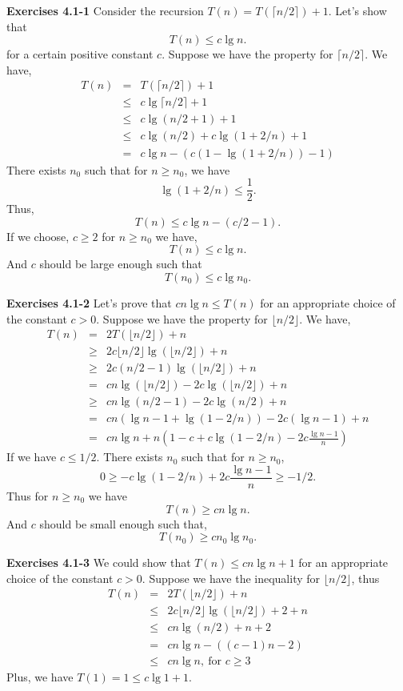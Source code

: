 \documentclass[a4paper,12pt]{article}
\newcommand{\newpar}[1]
{\bigskip \noindent \textbf{Exercises #1} \newline}
\begin{document}
\newpar{4.1-1}
Consider the recursion $T(n) = T(\lceil n/2\rceil) + 1$.  Let's show
that
\[ T(n) \le c \lg n.\]
for a certain positive constant $c$.  Suppose we have the property for 
$\lceil n/2 \rceil$.  We have,
\begin{eqnarray*}
T(n) &=& T(\lceil n/2\rceil) + 1 \\
&\le& c\lg \lceil n/2\rceil + 1 \\
&\le& c\lg(n/2 + 1) + 1 \\
&\le& c\lg(n/2) + c\lg(1 + 2/n) + 1 \\
&=& c\lg n - (c(1 - \lg(1 + 2/n)) - 1)
\end{eqnarray*}
There exists $n_0$ such that for $n \ge n_0$, we have
\[ \lg(1 + 2/n) \le \frac{1}{2}.\]
Thus,
\[ T(n) \le c\lg n - (c/2 - 1).\]
If we choose, $c \ge 2$ for $n \ge n_0$ we have,
\[ T(n) \le c\lg n.\]
And $c$ should be large enough such that
\[ T(n_0) \le c\lg n_0.\]

\newpar{4.1-2}
Let's prove that $c n\lg n \le T(n)$ for an appropriate choice of the
constant $c > 0$.  Suppose we have the property for $\lfloor n/2
\rfloor$. We have,
\begin{eqnarray*}
T(n) &=& 2 T(\lfloor n/2 \rfloor) + n \\
&\ge& 2c\lfloor n/2\rfloor
\lg(\lfloor n/2\rfloor) + n \\
&\ge&2c(n/2-1) \lg(\lfloor n/2\rfloor) + n \\
&=& c n\lg(\lfloor n/2\rfloor) - 2c\lg(\lfloor n/2\rfloor) + n \\
&\ge& cn\lg(n/2 - 1) - 2c\lg(n/2) + n \\
&=& cn(\lg n - 1 + \lg(1 - 2/n)) - 2c(\lg n-1) + n \\
&=& cn\lg n + n\left(1 - c + c\lg(1-2/n) - 2c\frac{\lg n-1}{n}\right)
\end{eqnarray*}
If we have $c \le 1/2$. There exists $n_0$ such that for $n \ge n_0$,
\[ 0 \ge -c \lg(1-2/n) + 2c\frac{\lg n - 1}{n} \ge -1/2.\]
Thus for $n \ge n_0$ we have
\[ T(n) \ge cn\lg n.\]
And $c$ should be small enough such that,
\[ T(n_0) \ge cn_0\lg n_0.\]

\newpar{4.1-3}
We could show that $T(n) \le cn\lg n + 1$ for an appropriate choice of
the constant $c > 0$.  Suppose we have the inequality for 
$\lfloor n/2 \rfloor$, thus
\begin{eqnarray*}
T(n) &=& 2T(\lfloor n/2\rfloor) + n \\
&\le& 2c\lfloor n/2\rfloor \lg(\lfloor n/2\rfloor) + 2 + n \\
&\le& cn \lg(n/2) + n+2 \\
&=& cn\lg n - ((c-1) n - 2) \\
&\le& cn\lg n,\ \mbox{for $c \ge 3$}
\end{eqnarray*}
Plus, we have $T(1) = 1 \le c \lg 1 + 1$.
\end{document}
